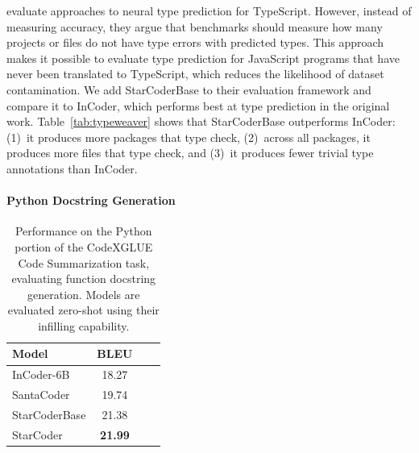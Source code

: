 \documentclass[10pt]{article} %
\begin{document}
\cite{yee:typeweaver} evaluate approaches to neural type prediction for TypeScript. However, instead of measuring accuracy, they argue that benchmarks should measure how many projects or files do not have type errors with predicted types. This approach makes it possible to evaluate type prediction for JavaScript programs that have never been translated to TypeScript, which reduces the likelihood of dataset contamination. We add StarCoderBase to their evaluation framework and compare it to InCoder, which performs best at type prediction in the original work. Table~\ref{tab:typeweaver} shows that StarCoderBase outperforms InCoder: (1)~it produces more packages that type check, (2)~across all packages, it produces more files that type check, and (3)~it produces fewer trivial type annotations than InCoder.

\paragraph{Python Docstring Generation}
\begin{table}[t]
\centering
\begin{tabular}{lccc}
\toprule
\textbf{Model} & \textbf{BLEU} \\
\midrule
InCoder-6B & 18.27  \\
SantaCoder & 19.74  \\
StarCoderBase & 21.38 \\
StarCoder & \textbf{21.99} \\
\bottomrule
\end{tabular}
\caption{Performance on the Python portion of the CodeXGLUE Code Summarization task, evaluating function docstring generation. Models are evaluated zero-shot using their infilling capability. 
}  
\label{tab:Python_docstring_gen}
\end{table}
\end{document}
